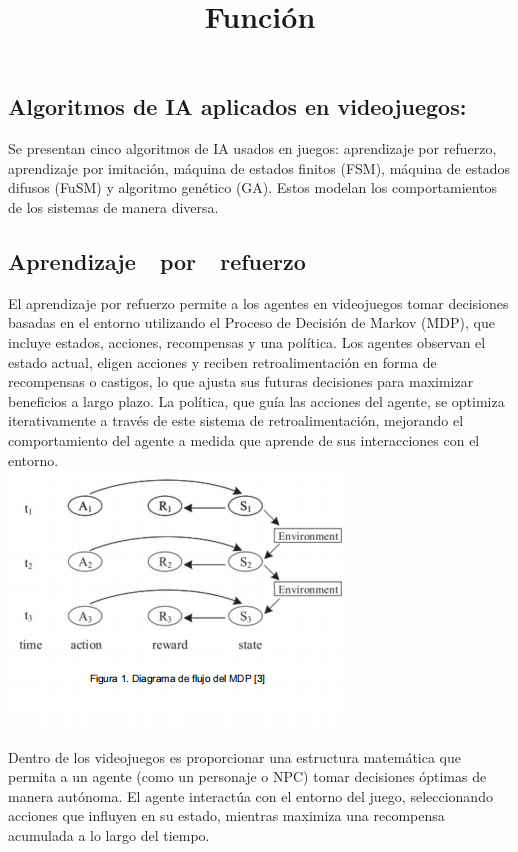 \documentclass{article}
\begin{document}
\subsection{Algoritmos de IA aplicados en videojuegos:
}
Se presentan cinco algoritmos de IA usados en juegos: aprendizaje por refuerzo, aprendizaje por imitación, máquina de estados finitos (FSM), máquina de estados difusos (FuSM) y algoritmo genético (GA). Estos modelan los comportamientos de los sistemas de manera diversa.

\subsection{Aprendizaje  por  refuerzo}
El aprendizaje por refuerzo permite a los agentes en videojuegos tomar decisiones basadas en el entorno utilizando el Proceso de Decisión de Markov (MDP), que incluye estados, acciones, recompensas y una política. Los agentes observan el estado actual, eligen acciones y reciben retroalimentación en forma de recompensas o castigos, lo que ajusta sus futuras decisiones para maximizar beneficios a largo plazo. La política, que guía las acciones del agente, se optimiza iterativamente a través de este sistema de retroalimentación, mejorando el comportamiento del agente a medida que aprende de sus interacciones con el entorno.
\\

\includegraphics{MDP.png}
\\

\title{\textbf{Función}}

Dentro de los videojuegos es proporcionar una estructura matemática que permita a un agente (como un personaje o NPC) tomar decisiones óptimas de manera autónoma. El agente interactúa con el entorno del juego, seleccionando acciones que influyen en su estado, mientras maximiza una recompensa acumulada a lo largo del tiempo.
\\
\end{document}
